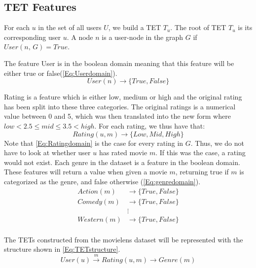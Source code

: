 \subsection{TET Features}


For each $u$ in the set of all users $U$, we build a TET $T_u$. The root of TET $T_u$ is its corresponding user $u$.
A node $n$ is a user-node in the graph $G$ if $User(n, \, G) = True$.

The feature User is in the boolean domain meaning that this feature will be either true or false(\autoref{Eq:Userdomain}).
\begin{equation}\label{Eq:Userdomain}
  User(n)\rightarrow \{True, False\}
\end{equation}


Rating is a feature which is either low, medium or high and the original rating has been split into these three categories.
The original ratings is a numerical value between 0 and 5, which was then translated into the new form where $low<2.5\leq mid \leq 3.5<high$.
For each rating, we thus have that:
\begin{equation}\label{Eq:Ratingdomain}
    Rating(u, m) \rightarrow \{Low, Mid, High\}
\end{equation}
Note that \autoref{Eq:Ratingdomain} is the case for every rating in $G$. Thus, we do not have to look at whether user $u$ has rated movie $m$. If this was the case, a rating would not exist.
Each genre in the dataset is a feature in the boolean domain. These features will return a value when given a movie $m$, returning true if $m$ is categorized as the genre, and false otherwise (\autoref{Eq:genredomain}).
\begin{equation}\label{Eq:genredomain}
\begin{aligned}
Action(m)& \rightarrow \{True, False\} \\
Comedy(m)& \rightarrow \{True, False\} \\
&\vdots \\
Western(m)& \rightarrow \{True, False\} \\
\end{aligned}
\end{equation}

The TETs constructed from the movielens dataset will be represented with the structure shown in \autoref{Eq:TETstructure}.
\begin{equation}\label{Eq:TETstructure}
User(u) \stackrel{m}{\longrightarrow} Rating(u,m) \longrightarrow Genre(m)
\end{equation}

